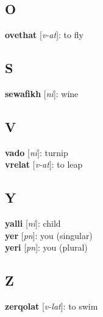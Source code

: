 \begin{multicols}{2}
\subsection*{O}
\textbf{ovethat} [\textit{v-at}]: to fly \\
\subsection*{S}
\textbf{sewafikh} [\textit{ni}]: wine \\
\subsection*{V}
\textbf{vado} [\textit{ni}]: turnip \\
\textbf{vrelat} [\textit{v-at}]: to leap \\
\subsection*{Y}
\textbf{yalli} [\textit{ni}]: child \\
\textbf{yer} [\textit{pn}]: you (singular) \\
\textbf{yeri} [\textit{pn}]: you (plural) \\
\subsection*{Z}
\textbf{zerqolat} [\textit{v-lat}]: to swim \\
\end{multicols}
\pagebreak
